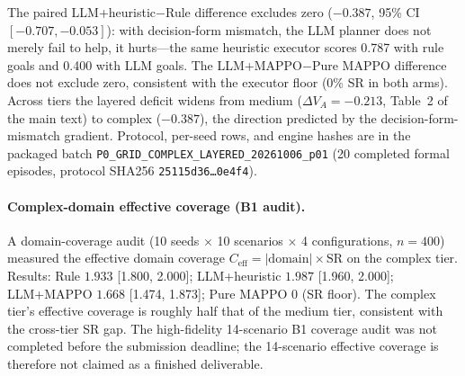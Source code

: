 \documentclass[sigconf,anonymous]{aamas}
\begin{document}
\begin{table}[H]
\centering
\caption{Complex-tier four-stack batch (5 paired seeds): mean composite and success rate with paired differences against the same-condition pure baseline (seed-bootstrap 95\% CIs).}
\label{tab:complexlayered}
\end{table}

The paired LLM+heuristic$-$Rule difference excludes zero ($-0.387$, 95\% CI $[-0.707,-0.053]$): with decision-form mismatch, the LLM planner does not merely fail to help, it hurts---the same heuristic executor scores 0.787 with rule goals and 0.400 with LLM goals. The LLM+MAPPO$-$Pure MAPPO difference does not exclude zero, consistent with the executor floor (0\% SR in both arms). Across tiers the layered deficit widens from medium ($\Delta V_A = -0.213$, Table~2 of the main text) to complex ($-0.387$), the direction predicted by the decision-form-mismatch gradient. Protocol, per-seed rows, and engine hashes are in the packaged batch \texttt{P0\_GRID\_COMPLEX\_LAYERED\_20261006\_p01} (20 completed formal episodes, protocol SHA256 \texttt{25115d36\ldots 0e4f4}).

\paragraph{Complex-domain effective coverage (B1 audit).}
A domain-coverage audit (10 seeds $\times$ 10 scenarios $\times$ 4 configurations, $n=400$) measured the effective domain coverage $C_{\mathrm{eff}} = |\text{domain}| \times \text{SR}$ on the complex tier. Results: Rule $1.933$ [1.800, 2.000]; LLM+heuristic $1.987$ [1.960, 2.000]; LLM+MAPPO $1.668$ [1.474, 1.873]; Pure MAPPO $0$ (SR floor). The complex tier's effective coverage is roughly half that of the medium tier, consistent with the cross-tier SR gap. The high-fidelity 14-scenario B1 coverage audit was not completed before the submission deadline; the 14-scenario effective coverage is therefore not claimed as a finished deliverable.
\end{document}
